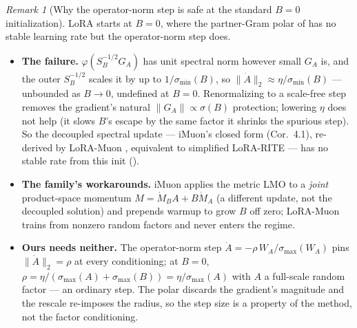\documentclass[11pt]{article}
\newcommand{\smax}{\sigma_{\max}}
\newcommand{\polar}{\varphi}                 %
\theoremstyle{plain}
\theoremstyle{definition}
\theoremstyle{remark}
\newtheorem{remark}{Remark}
\begin{document}
\begin{remark}[Why the operator-norm step is safe at the standard $B{=}0$ initialization]
\label{rem:b0}
LoRA starts at $B{=}0$, where the partner-Gram polar of  has no stable learning rate but the operator-norm step does.
\begin{itemize}[leftmargin=1.5em,itemsep=1pt,topsep=2pt]
  \item \textbf{The failure.} $\polar(S_B^{-1/2}G_A)$ has unit spectral norm however small $G_A$ is, and the outer $S_B^{-1/2}$ scales it by up to $1/\sigma_{\min}(B)$, so $\|\dot A\|_2\approx\eta/\sigma_{\min}(B)$ --- unbounded as $B\to0$, undefined at $B{=}0$. Renormalizing to a scale-free step removes the gradient's natural $\|G_A\|\propto\sigma(B)$ protection; lowering $\eta$ does not help (it slows $B$'s escape by the same factor it shrinks the spurious step). So the decoupled spectral update --- iMuon's closed form (Cor.\ 4.1), re-derived by LoRA-Muon \cite{loramuon}, equivalent to simplified LoRA-RITE \cite{lorarite} --- has no stable rate from this init ().
  \item \textbf{The family's workarounds.} iMuon applies the metric LMO to a \emph{joint} product-space momentum $M=\dot M_BA+B\dot M_A$ (a different update, not the decoupled solution) and prepends warmup to grow $B$ off zero; LoRA-Muon trains from nonzero random factors and never enters the regime.
  \item \textbf{Ours needs neither.} The operator-norm step $\dot A=-\rho\,W_A/\smax(W_A)$ pins $\|\dot A\|_2=\rho$ at every conditioning; at $B{=}0$, $\rho=\eta/(\smax(A)+\smax(B))=\eta/\smax(A)$ with $A$ a full-scale random factor --- an ordinary step. The polar discards the gradient's magnitude and the rescale re-imposes the radius, so the step size is a property of the method, not the factor conditioning.
\end{itemize}
\end{remark}
\end{document}
